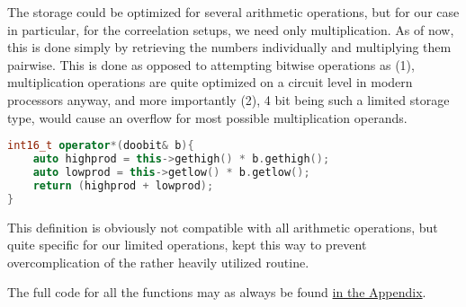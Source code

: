 The storage could be optimized for several arithmetic operations, but for our
case in particular, for the correelation setups, we need only multiplication. As
of now, this is done simply by retrieving the numbers individually and
multiplying them pairwise. This is done as opposed to attempting bitwise
operations as (1), multiplication operations are quite optimized on a circuit
level in modern processors anyway, and more importantly (2), 4 bit being such a
limited storage type, would cause an overflow for most possible multiplication
operands.

\begin{lstlisting}[language=C++]
int16_t operator*(doobit& b){
    auto highprod = this->gethigh() * b.gethigh();
    auto lowprod = this->getlow() * b.getlow();
    return (highprod + lowprod);
}
\end{lstlisting}

This definition is obviously not compatible with all arithmetic operations, but
quite specific for our limited operations, kept this way to prevent
overcomplication of the rather heavily utilized routine.

The full code for all the functions may as always be found
\hyperref[sec:arduinocode]{in the Appendix}.